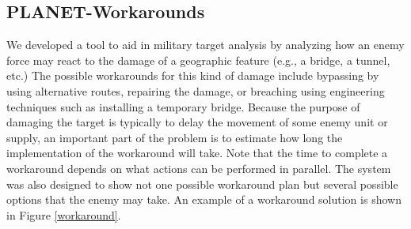 \subsection{PLANET-Workarounds}

We developed a tool to aid in military target analysis 
by analyzing how an enemy force may react to the
damage of a geographic feature (e.g., a bridge, a tunnel, etc.)
The possible workarounds for this kind of damage
include bypassing by using alternative routes,
repairing the damage, or breaching using engineering techniques such as
installing a temporary bridge.  
Because the purpose of damaging the target is typically to delay 
the movement of some enemy unit or supply,
an important part of the problem is to 
estimate how long the implementation 
of the workaround will take.  
Note that the time to complete a workaround 
depends on what actions can be performed in
parallel.  
The system was also designed to show not one possible 
workaround plan but several possible options 
that the enemy may take. 
An example of a workaround solution is
shown in Figure \ref{workaround}.

